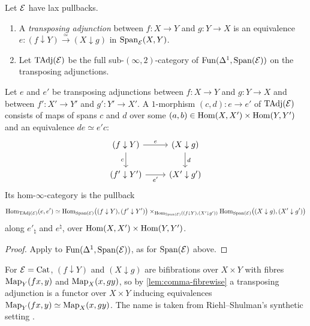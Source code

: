 \begin{defi}
\label{def:transposing-adjunction}
%
Let $\mathcal{E}$ have lax pullbacks.
\begin{enumerate}
\item A \emph{transposing adjunction} between $f\colon X \to Y$ and $g\colon Y
\to X$ is an equivalence
$e\colon (f \downarrow Y) \xrightarrow{\simeq} (X \downarrow g)$
in $\mathrm{Span}_{\mathcal{E}}(X,Y)$.
\item Let $\mathrm{TAdj}(\mathcal{E})$ be the full sub-$(\infty,2)$-category of
$\operatorname{Fun}(\Delta^{1},\mathrm{Span}(\mathcal{E}))$
on the transposing adjunctions.
\end{enumerate}
\end{defi}

\begin{lem}
\label{lem:tadj-homs}
%
Let $e$ and $e'$ be transposing adjunctions between
$f\colon X \to Y$ and $g\colon Y \to X$ and between
$f'\colon X' \to Y'$ and $g'\colon Y' \to X'$.
A $1$-morphism $(c,d)\colon e \to e'$ of $\mathrm{TAdj}(\mathcal{E})$ consists of maps of spans
$c$ and $d$ over some
$(a,b) \in \operatorname{Hom}(X,X') \times \operatorname{Hom}(Y,Y')$
and an equivalence $de \simeq e'c$:
\begin{equation*}
\begin{tikzcd}
(f \downarrow Y) \ar[r, "e"] \ar[d, "c"'] & (X \downarrow g) \ar[d, "d"] \\
(f' \downarrow Y') \ar[r, "e'"'] & (X' \downarrow g')
\end{tikzcd}
\end{equation*}
Its hom-$\infty$-category is the pullback
\begin{equation*}
\operatorname{Hom}_{\mathrm{TAdj}(\mathcal{E})}(e,e') \simeq \operatorname{Hom}_{\mathrm{Span}(\mathcal{E})}\bigl((f \downarrow Y),(f'
\downarrow Y')\bigr) \times_{\operatorname{Hom}_{\mathrm{Span}(\mathcal{E})}((f \downarrow Y),(X' \downarrow
g'))} \operatorname{Hom}_{\mathrm{Span}(\mathcal{E})}\bigl((X \downarrow g),(X' \downarrow g')\bigr)
\end{equation*}
along $e'_{\natural}$ and $e^{\natural}$, over
$\operatorname{Hom}(X,X') \times \operatorname{Hom}(Y,Y')$.
\end{lem}

\begin{proof}
%
Apply \cite[Prop.~4.1.2]{abellangagnahaugseng2024straightening} to
$\operatorname{Fun}(\Delta^{1},\mathrm{Span}(\mathcal{E}))$,
as for $\mathrm{Span}(\mathcal{E})$ above.
\end{proof}

%
For $\mathcal{E} = \mathrm{Cat}$, $(f \downarrow Y)$ and $(X \downarrow g)$ are bifibrations over
$X \times Y$ with fibres $\operatorname{Map}_{Y}(fx,y)$ and $\operatorname{Map}_{X}(x,gy)$,
so by \cref{lem:comma-fibrewise} a transposing adjunction is a functor over $X
\times Y$ inducing equivalences
$\operatorname{Map}_{Y}(fx,y) \simeq \operatorname{Map}_{X}(x,gy)$.
The name is taken from Riehl--Shulman's synthetic setting
\cite[Def.~11.1]{riehlshulman2017synthetic}.


